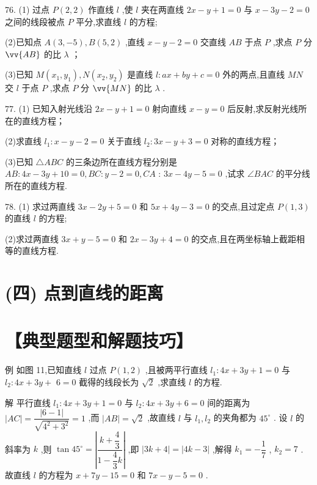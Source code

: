 76. (1) 过点 $P\left( {2,2}\right)$ 作直线 $l$ ,使 $l$ 夹在两直线 ${2x} - y + 1 = 0$ 与 $x - {3y} - 2 = 0$ 之间的线段被点 $P$ 平分,求直线 $l$ 的方程;

(2)已知点 $A\left( {3, - 5}\right) ,B\left( {5,2}\right)$ ,直线 $x - y - 2 = 0$ 交直线 ${AB}$ 于点 $P$ ,求点 $P$ 分 $\vv{AB}$ 的比 $\lambda$ ；

(3)已知 $M\left( {{x}_{1},{y}_{1}}\right) ,N\left( {{x}_{2},{y}_{2}}\right)$ 是直线 $l : {ax} + {by} + c = 0$ 外的两点,且直线 ${MN}$ 交 $l$ 于点 $P$ ,求点 $P$ 分 $\vv{MN}$ 的比 $\lambda$ .

77. (1) 已知入射光线沿 ${2x} - y + 1 = 0$ 射向直线 $x - y = 0$ 后反射,求反射光线所在的直线方程；

(2)求直线 ${l}_{1} : x - y - 2 = 0$ 关于直线 ${l}_{2} : {3x} - y + 3 = 0$ 对称的直线方程；

(3)已知 $\bigtriangleup  {ABC}$ 的三条边所在直线方程分别是 ${AB} : {4x} - {3y} + {10} = 0,{BC} : y - 2 = 0,{CA}$ : ${3x} - {4y} - 5 = 0$ ,试求 $\angle {BAC}$ 的平分线所在的直线方程.

78. (1) 求过两直线 ${3x} - {2y} + 5 = 0$ 和 ${5x} + {4y} - 3 = 0$ 的交点,且过定点 $P\left( {1,3}\right)$ 的直线 $l$ 的方程;

(2)求过两直线 ${3x} + y - 5 = 0$ 和 ${2x} - {3y} + 4 = 0$ 的交点,且在两坐标轴上截距相等的直线方程.

\section*{(四) 点到直线的距离}

\section*{【典型题型和解题技巧】}

例 如图 11,已知直线 $l$ 过点 $P\left( {1,2}\right)$ ,且被两平行直线 ${l}_{1} : {4x} + {3y} + 1 = 0$ 与 ${l}_{2} : {4x} + {3y} +$  $6 = 0$ 截得的线段长为 $\sqrt{2}$ ,求直线 $l$ 的方程.

解 平行直线 ${l}_{1} : {4x} + {3y} + 1 = 0$ 与 ${l}_{2} : {4x} + {3y} + 6 = 0$ 间的距离为 $\left| {AC}\right|  = \dfrac{\left| 6 - 1\right| }{\sqrt{{4}^{2} + {3}^{2}}} = 1$ ,而 $\left| {AB}\right|  = \sqrt{2}$ ,故直线 $l$ 与 ${l}_{1},{l}_{2}$ 的夹角都为 ${45}^{ \circ  }$ . 设 $l$ 的斜率为 $k$ ,则 $\tan {45}^{ \circ  } = \left| \dfrac{k + \dfrac{4}{3}}{1 - \dfrac{4}{3}k}\right|$ ,即 $\left| {{3k} + 4}\right|  = \left| {{4k} - 3}\right|$ ,解得 ${k}_{1} =  - \dfrac{1}{7}$ , ${k}_{2} = 7$ . 故直线 $l$ 的方程为 $x + {7y} - {15} = 0$ 和 ${7x} - y - 5 = 0$ .

